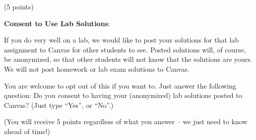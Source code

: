 \documentclass[]{article}
\begin{document}
(5 points)

\textbf{Consent to Use Lab Solutions}:

If you do very well on a lab, we would like to post your solutions for
that lab assignment to Canvas for other students to see. Posted
solutions will, of course, be anonymized, so that other students will
not know that the solutions are yours. We will not post homework or lab
exam solutions to Canvas.

You are welcome to opt out of this if you want to. Just answer the
following question: Do you consent to having your (anonymized) lab
solutions posted to Canvas? (Just type ``Yes'', or ``No''.)

(You will receive 5 points regardless of what you answer -- we just need
to know ahead of time!)
\end{document}
